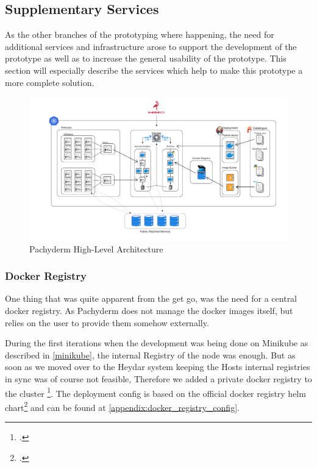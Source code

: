 \subsection{Supplementary Services}

As the other branches of the prototyping where happening, the need for additional services and infrastructure arose to 
support the development of the prototype as well as to increase the general usability of the prototype. 
This section will especially describe the services which help to make this prototype a more complete solution.


\begin{figure}[htb]
    \centering
    \includegraphics[width=17cm]{graphics/pachykouda_complete.png}
    \caption[Pachyderm High-Level Architecture]{Pachyderm High-Level Architecture}
    \label{abb:pachyderm_complete}
\end{figure}

\subsubsection{Docker Registry}

One thing that was quite apparent from the get go, was the need for a central docker registry.
As Pachyderm does not manage the docker images itself, but relies on the user to provide them somehow externally.

During the first iterations when the development was being done on Minikube as described in \ref{minikube}, the internal Registry 
of the node was enough.
But as soon as we moved over to the Heydar system keeping the Hosts internal registries in sync was of course not feasible,
Therefore we added a private docker registry to the cluster \footcite{kumarHowSetupPrivate2020}.
The deployment config is based on the official docker registry helm chart\footcite{Dockerregistry10Phntom} and can be found at \ref{appendix:docker_registry_config}.

